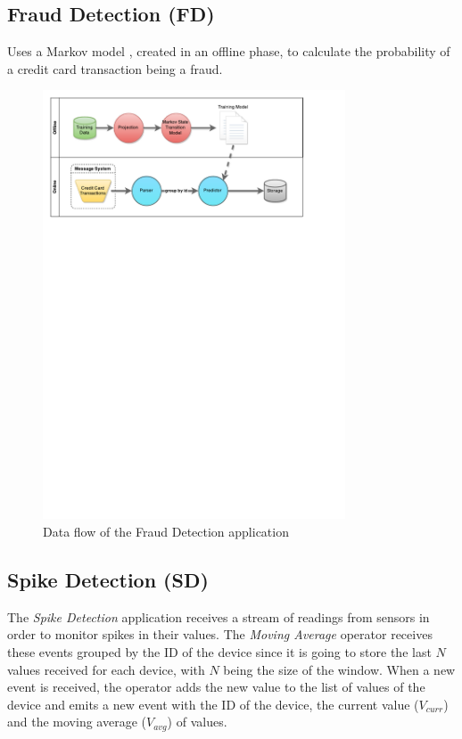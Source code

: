 \documentclass[ppgc,diss,english]{iiufrgs}
\begin{document}
\subsection{Fraud Detection (FD)}

Uses a Markov model \cite{srivastava2008credit}, created in an offline phase, to calculate the probability of a credit card transaction being a fraud.

\begin{figure}[!ht]
	\centering
	\includegraphics[width=0.8\textwidth]{images/apps/FraudDetection.pdf}
	\caption{Data flow of the Fraud Detection application}
	\label{fig:app_fraud_detection}
\end{figure}

\subsection{Spike Detection (SD)}

The \emph{Spike Detection} application receives a stream of readings from sensors in order to monitor spikes in their values. The \emph{Moving Average} operator receives these events grouped by the ID of the device since it is going to store the last $N$ values received for each device, with $N$ being the size of the window. When a new event is received, the operator adds the new value to the list of values of the device and emits a new event with the ID of the device, the current value ($V_{curr}$) and the moving average ($V_{avg}$) of values.
\end{document}
